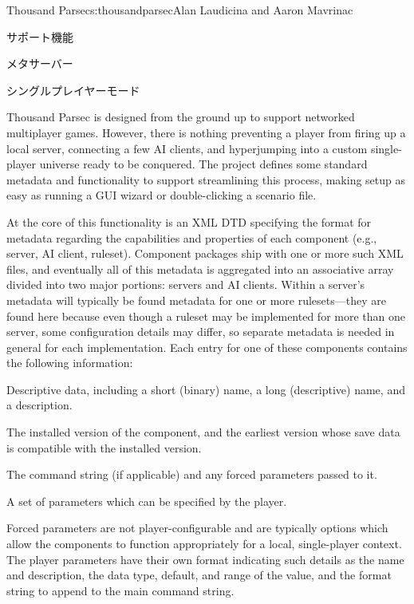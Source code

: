 \begin{aosachapter}{Thousand Parsec}{s:thousandparsec}{Alan Laudicina and Aaron Mavrinac}
\begin{aosasect1}{サポート機能}
\begin{aosasect2}{メタサーバー}
\end{aosasect2}

\begin{aosasect2}{シングルプレイヤーモード}

Thousand Parsec is designed from the ground up to support networked
multiplayer games. However, there is nothing preventing a player from
firing up a local server, connecting a few AI clients, and
hyperjumping into a custom single-player universe ready to be
conquered. The project defines some standard metadata and
functionality to support streamlining this process, making setup as
easy as running a GUI wizard or double-clicking a scenario file.

At the core of this functionality is an XML DTD specifying the format
for metadata regarding the capabilities and properties of each
component (e.g., server, AI client, ruleset). Component packages ship
with one or more such XML files, and eventually all of this metadata
is aggregated into an associative array divided into two major
portions: servers and AI clients. Within a server's metadata will
typically be found metadata for one or more rulesets---they are found
here because even though a ruleset may be implemented for more than
one server, some configuration details may differ, so
separate metadata is needed in general for each implementation.
Each entry for one of these components contains the following information:

\begin{aosaitemize}

  \item Descriptive data, including a short (binary) name, a long
  (descriptive) name, and a description.

  \item The installed version of the component, and the earliest
  version whose save data is compatible with the installed version.

  \item The command string (if applicable) and any forced parameters
  passed to it.

  \item A set of parameters which can be specified by the player.

\end{aosaitemize}

Forced parameters are not player-configurable and are typically
options which allow the components to function appropriately for a
local, single-player context. The player parameters have their own
format indicating such details as the name and description, the data
type, default, and range of the value, and the format string to append
to the main command string.


\end{aosasect2}
\end{aosasect1}
\end{aosachapter}

